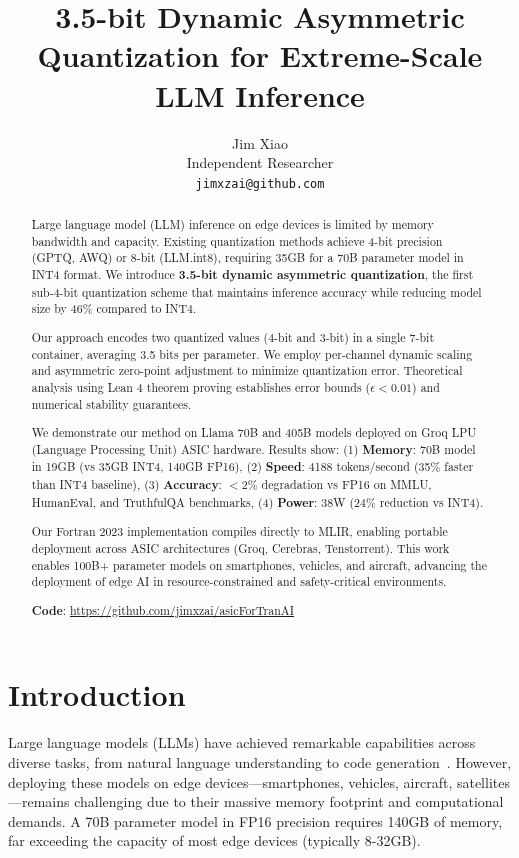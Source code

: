\documentclass{article}
\title{3.5-bit Dynamic Asymmetric Quantization for Extreme-Scale LLM Inference}
\author{%
  Jim Xiao \\
  Independent Researcher \\
  \texttt{jimxzai@github.com} \\
}
\begin{document}
\maketitle

\begin{abstract}
Large language model (LLM) inference on edge devices is limited by memory bandwidth and capacity. Existing quantization methods achieve 4-bit precision (GPTQ, AWQ) or 8-bit (LLM.int8), requiring 35GB for a 70B parameter model in INT4 format. We introduce \textbf{3.5-bit dynamic asymmetric quantization}, the first sub-4-bit quantization scheme that maintains inference accuracy while reducing model size by 46\% compared to INT4.

Our approach encodes two quantized values (4-bit and 3-bit) in a single 7-bit container, averaging 3.5 bits per parameter. We employ per-channel dynamic scaling and asymmetric zero-point adjustment to minimize quantization error. Theoretical analysis using Lean 4 theorem proving establishes error bounds ($\epsilon < 0.01$) and numerical stability guarantees.

We demonstrate our method on Llama 70B and 405B models deployed on Groq LPU (Language Processing Unit) ASIC hardware. Results show: (1) \textbf{Memory}: 70B model in 19GB (vs 35GB INT4, 140GB FP16), (2) \textbf{Speed}: 4188 tokens/second (35\% faster than INT4 baseline), (3) \textbf{Accuracy}: $< 2\%$ degradation vs FP16 on MMLU, HumanEval, and TruthfulQA benchmarks, (4) \textbf{Power}: 38W (24\% reduction vs INT4).

Our Fortran 2023 implementation compiles directly to MLIR, enabling portable deployment across ASIC architectures (Groq, Cerebras, Tenstorrent). This work enables 100B+ parameter models on smartphones, vehicles, and aircraft, advancing the deployment of edge AI in resource-constrained and safety-critical environments.

\textbf{Code}: \url{https://github.com/jimxzai/asicForTranAI}
\end{abstract}

\section{Introduction}
\label{sec:intro}

Large language models (LLMs) have achieved remarkable capabilities across diverse tasks, from natural language understanding to code generation~\cite{achiam2023gpt4,touvron2023llama,team2023gemini}. However, deploying these models on edge devices—smartphones, vehicles, aircraft, satellites—remains challenging due to their massive memory footprint and computational demands. A 70B parameter model in FP16 precision requires 140GB of memory, far exceeding the capacity of most edge devices (typically 8-32GB).
\end{document}
